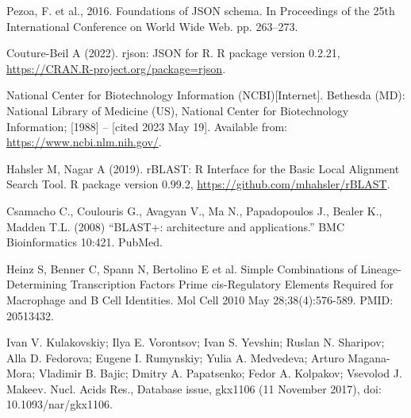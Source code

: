 \documentclass[12pt]{article}
\begin{document}
\begin{thebibliography}{99}
 Pezoa, F. et al., 2016. Foundations of JSON schema. In
Proceedings of the 25th International Conference on World Wide Web. pp. 263–273.

 Couture-Beil A (2022). rjson: JSON for R. R package version
0.2.21, \newline
\url{https://CRAN.R-project.org/package=rjson}.

 National Center for Biotechnology Information (NCBI)[Internet].
Bethesda (MD): National Library of Medicine (US), National Center for
Biotechnology Information; [1988] – [cited 2023 May 19]. Available from:
\url{https://www.ncbi.nlm.nih.gov/}.

 Hahsler M, Nagar A (2019). rBLAST: R Interface for the Basic
Local Alignment Search Tool. R package version 0.99.2, \newline
\url{https://github.com/mhahsler/rBLAST}.

 Csamacho C., Coulouris G., Avagyan V., Ma N., Papadopoulos J.,
Bealer K., Madden T.L. (2008) “BLAST+: architecture and applications.”
BMC Bioinformatics 10:421. PubMed.

 Heinz S, Benner C, Spann N, Bertolino E et al. Simple
Combinations of Lineage-Determining Transcription Factors Prime cis-Regulatory
Elements Required for Macrophage and B Cell Identities. Mol Cell 2010 May
28;38(4):576-589. PMID: 20513432.

 Ivan V. Kulakovskiy; Ilya E. Vorontsov; Ivan S. Yevshin;
Ruslan N. Sharipov; Alla D. Fedorova; Eugene I. Rumynskiy; Yulia A. Medvedeva;
Arturo Magana-Mora; Vladimir B. Bajic; Dmitry A. Papatsenko; Fedor A. Kolpakov;
Vsevolod J. Makeev. Nucl. Acids Res., Database issue, gkx1106
(11 November 2017), doi: 10.1093/nar/gkx1106.

\end{thebibliography}
\end{document}
